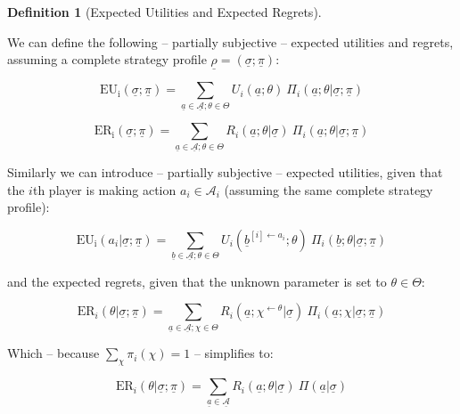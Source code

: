 \documentclass{article}
\theoremstyle{definition}
\newtheorem{definition}{Definition}[section]
\begin{document}
\begin{definition}[Expected Utilities and Expected Regrets]
\label{def:EUER}

We can define the following -- partially subjective -- expected utilities and regrets, assuming a complete strategy profile $\underline{\rho} = ( \underline{\sigma}; \underline{\pi} )$:

    \begin{equation}
        \mathrm{EU_i}(\underline{\sigma};\underline{\pi}) = 
        \sum_{\underline{a} \in \underline{\mathcal{A}};\theta \in \Theta}
        U_i(\underline{a};\theta) \ 
        \Pi_i(\underline{a};\theta|\underline{\sigma};\underline{\pi})
    \end{equation}

    \begin{equation}
        \mathrm{ER_i}(\underline{\sigma};\underline{\pi}) = 
         \sum_{\underline{a} \in \underline{\mathcal{A}};\theta \in \Theta}
        R_i(\underline{a};\theta|\underline{\sigma}) \ 
        \Pi_i(\underline{a};\theta|\underline{\sigma};\underline{\pi})
    \end{equation}

Similarly we can introduce -- partially subjective -- expected utilities, given that the $i$th player is making action $a_i \in \mathcal{A}_i$  (assuming the same complete strategy profile):

    \begin{equation}
        \mathrm{EU_i}(a_i|\underline{\sigma};\underline{\pi}) = 
        \sum_{\underline{b} \in \underline{\mathcal{A}};\theta \in \Theta}
        U_i(\underline{b}^{[i] \leftarrow a_i};\theta) \ 
        \Pi_i(\underline{b};\theta|\underline{\sigma};\underline{\pi})
    \end{equation}

and the expected regrets, given that the unknown parameter is set to $\theta \in \Theta$:

    \begin{equation}
    \label{defeq:ER_from_Regret}
        \mathrm{ER}_i(\theta | \underline{\sigma};\underline{\pi}) = 
        \sum_{\underline{a} \in \underline{\mathcal{A}};\chi \in \Theta}
        R_i(\underline{a};\chi^{\leftarrow \theta} |\underline{\sigma}) \ 
        \Pi_i(\underline{a};\chi|\underline{\sigma};\underline{\pi})
    \end{equation}

Which -- because $\sum_\chi \pi_i(\chi) = 1$ -- simplifies to:

    \begin{equation}
        \mathrm{ER}_i(\theta | \underline{\sigma};\underline{\pi}) = 
        \sum_{\underline{a} \in \underline{\mathcal{A}}}
        R_i(\underline{a};\theta|\underline{\sigma}) \ 
        \Pi(\underline{a}|\underline{\sigma})
    \end{equation}
    
\end{definition}
\end{document}
